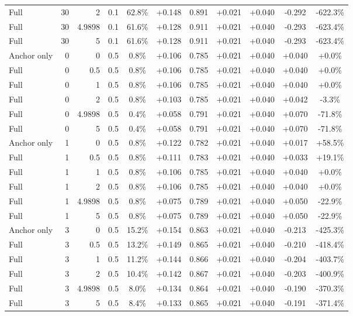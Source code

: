 \begin{table}[htbp]
\begin{tabular}{lrrrccccccc}
Full & 30 & 2 & 0.1 & 62.8\% & +0.148 & 0.891 & +0.021 & +0.040 & -0.292 & -622.3\% \\
Full & 30 & 4.9898 & 0.1 & 61.6\% & +0.128 & 0.911 & +0.021 & +0.040 & -0.293 & -623.4\% \\
Full & 30 & 5 & 0.1 & 61.6\% & +0.128 & 0.911 & +0.021 & +0.040 & -0.293 & -623.4\% \\
Anchor only & 0 & 0 & 0.5 & 0.8\% & +0.106 & 0.785 & +0.021 & +0.040 & +0.040 & +0.0\% \\
Full & 0 & 0.5 & 0.5 & 0.8\% & +0.106 & 0.785 & +0.021 & +0.040 & +0.040 & +0.0\% \\
Full & 0 & 1 & 0.5 & 0.8\% & +0.106 & 0.785 & +0.021 & +0.040 & +0.040 & +0.0\% \\
Full & 0 & 2 & 0.5 & 0.8\% & +0.103 & 0.785 & +0.021 & +0.040 & +0.042 & -3.3\% \\
Full & 0 & 4.9898 & 0.5 & 0.4\% & +0.058 & 0.791 & +0.021 & +0.040 & +0.070 & -71.8\% \\
Full & 0 & 5 & 0.5 & 0.4\% & +0.058 & 0.791 & +0.021 & +0.040 & +0.070 & -71.8\% \\
Anchor only & 1 & 0 & 0.5 & 0.8\% & +0.122 & 0.782 & +0.021 & +0.040 & +0.017 & +58.5\% \\
Full & 1 & 0.5 & 0.5 & 0.8\% & +0.111 & 0.783 & +0.021 & +0.040 & +0.033 & +19.1\% \\
Full & 1 & 1 & 0.5 & 0.8\% & +0.106 & 0.785 & +0.021 & +0.040 & +0.040 & +0.0\% \\
Full & 1 & 2 & 0.5 & 0.8\% & +0.106 & 0.785 & +0.021 & +0.040 & +0.040 & +0.0\% \\
Full & 1 & 4.9898 & 0.5 & 0.8\% & +0.075 & 0.789 & +0.021 & +0.040 & +0.050 & -22.9\% \\
Full & 1 & 5 & 0.5 & 0.8\% & +0.075 & 0.789 & +0.021 & +0.040 & +0.050 & -22.9\% \\
Anchor only & 3 & 0 & 0.5 & 15.2\% & +0.154 & 0.863 & +0.021 & +0.040 & -0.213 & -425.3\% \\
Full & 3 & 0.5 & 0.5 & 13.2\% & +0.149 & 0.865 & +0.021 & +0.040 & -0.210 & -418.4\% \\
Full & 3 & 1 & 0.5 & 11.2\% & +0.144 & 0.866 & +0.021 & +0.040 & -0.204 & -403.7\% \\
Full & 3 & 2 & 0.5 & 10.4\% & +0.142 & 0.867 & +0.021 & +0.040 & -0.203 & -400.9\% \\
Full & 3 & 4.9898 & 0.5 & 8.0\% & +0.134 & 0.864 & +0.021 & +0.040 & -0.190 & -370.3\% \\
Full & 3 & 5 & 0.5 & 8.4\% & +0.133 & 0.865 & +0.021 & +0.040 & -0.191 & -371.4\% \\

\end{tabular}
\end{table}
